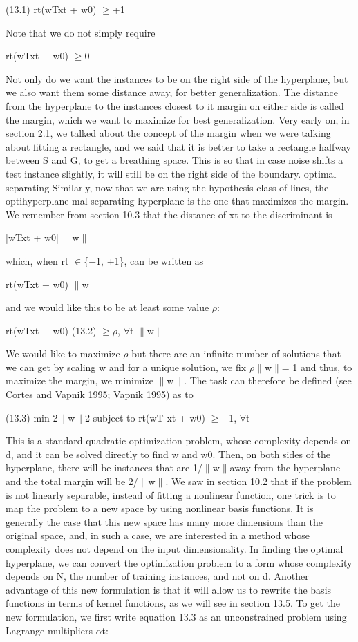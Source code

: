 (13.1) rt(wTxt + w0) $\geq$+1

Note that we do not simply require

rt(wTxt + w0) $\geq$0

Not only do we want the instances to be on the right side of the hyperplane, but we also want them some distance away, for better generalization. The distance from the hyperplane to the instances closest to it margin on either side is called the margin, which we want to maximize for best generalization. Very early on, in section 2.1, we talked about the concept of the margin when we were talking about fitting a rectangle, and we said that it is better to take a rectangle halfway between S and G, to get a breathing space. This is so that in case noise shifts a test instance slightly, it will still be on the right side of the boundary. optimal separating Similarly, now that we are using the hypothesis class of lines, the optihyperplane mal separating hyperplane is the one that maximizes the margin. We remember from section 10.3 that the distance of xt to the discriminant is

|wTxt + w0| $\parallel$w$\parallel$

which, when rt $\in$\{$-$1, +1\}, can be written as

rt(wTxt + w0) $\parallel$w$\parallel$

and we would like this to be at least some value $\rho$:

rt(wTxt + w0) (13.2) $\geq$$\rho$, $\forall$t $\parallel$w$\parallel$

We would like to maximize $\rho$ but there are an infinite number of solutions that we can get by scaling w and for a unique solution, we fix $\rho$$\parallel$w$\parallel$= 1 and thus, to maximize the margin, we minimize $\parallel$w$\parallel$. The task can therefore be defined (see Cortes and Vapnik 1995; Vapnik 1995) as to

(13.3) min 2$\parallel$w$\parallel$2 subject to rt(wT xt + w0) $\geq$+1, $\forall$t

This is a standard quadratic optimization problem, whose complexity depends on d, and it can be solved directly to find w and w0. Then, on both sides of the hyperplane, there will be instances that are 1/$\parallel$w$\parallel$away from the hyperplane and the total margin will be 2/$\parallel$w$\parallel$. We saw in section 10.2 that if the problem is not linearly separable, instead of fitting a nonlinear function, one trick is to map the problem to a new space by using nonlinear basis functions. It is generally the case that this new space has many more dimensions than the original space, and, in such a case, we are interested in a method whose complexity does not depend on the input dimensionality. In finding the optimal hyperplane, we can convert the optimization problem to a form whose complexity depends on N, the number of training instances, and not on d. Another advantage of this new formulation is that it will allow us to rewrite the basis functions in terms of kernel functions, as we will see in section 13.5. To get the new formulation, we first write equation 13.3 as an unconstrained problem using Lagrange multipliers $\alpha$t:

